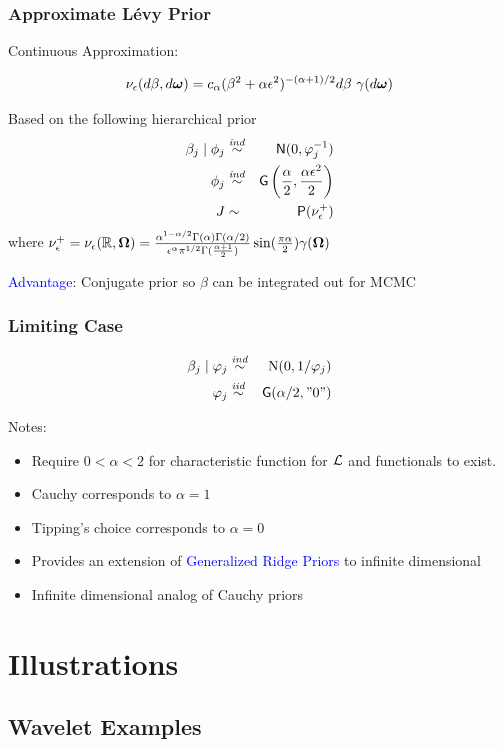\documentclass[dvips]{beamer}
\newcommand{\bs}[2]{\begin{frame} \frametitle{#1} 
{#2}
\end{frame} }
\newcommand{\blue}{\textcolor{Blue}}
\begin{document}
\bs{Approximate L\'evy Prior} {
Continuous Approximation: 

$$\nu_\epsilon(d\beta, d \bm \omega) = c_\alpha (\beta^2 + \alpha
\epsilon^2)^{-(\alpha + 1)/2} d\beta \ \gamma(d \bm \omega) $$

Based on the following hierarchical prior
\begin{eqnarray*}
  \beta_j \mid \phi_j & \mathrel{\mathop{\sim}\limits^{\mathit{ind}}} & \textsf{N}(0,  \varphi_j^{-1}) \\
  \phi_j    & \mathrel{\mathop{\sim}\limits^{\mathit{ind}}} & \mbox{\sf G}\left(\frac{\alpha}{2}, \frac{\alpha \epsilon^2}{2}\right) \\
   J & \sim & \mbox{\sf P}(\nu^+_\epsilon)
\end{eqnarray*}
where $\nu^+_\epsilon = \nu_\epsilon(\mathbb{R}, \bm \Omega) = \frac{\alpha ^{1
    - \alpha/2} \Gamma(\alpha)\Gamma(\alpha/2)}{\epsilon^\alpha
  \pi^{1/2} \Gamma(\frac{\alpha +1}{2})} \sin(\frac{\pi \alpha} {2}) \gamma(\bm \Omega)$

\blue{Advantage}: Conjugate prior so $\beta$ can be integrated out for MCMC
}

\bs{Limiting Case} {
  \begin{eqnarray*}
    \beta_j   \mid  \varphi_j & \mathrel{\mathop{\sim}\limits^{\mathit{ind}}} &\mbox{\rm N}(0, 1/\varphi_j) \\       
      \varphi_j & \mathrel{\mathop{\sim}\limits^{\mathit{iid}}} & \mbox{\sf G}(\alpha/2, "0")
  \end{eqnarray*}

Notes:
  \begin{itemize}
\item Require $0 < \alpha < 2$ for characteristic function for ${\cal L}$ and
  functionals to exist.  
\item  Cauchy corresponds to $\alpha = 1$
\item  Tipping's choice corresponds to $\alpha = 0$
\item Provides an extension of \blue{Generalized Ridge Priors}
      to infinite dimensional 
\item Infinite dimensional analog of Cauchy priors
 \end{itemize}
}


\section{Illustrations}
\subsection{Wavelet Examples}
\end{document}
